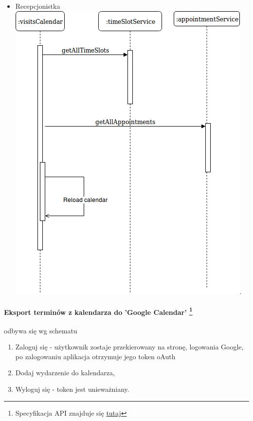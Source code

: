 \documentclass[polish,12pt]{aghthesis}
\begin{document}
\begin{itemize}
    \item Recepcjonistka \\
    \includegraphics[width=\textwidth]{cal-recep-init}.
\end{itemize}



\paragraph{Eksport terminów z kalendarza do 'Google Calendar' \footnote{Specyfikacja API znajduje się \href{https://www.googleapis.com/discovery/v1/apis/calendar/v3/rest}{tutaj}}} odbywa się wg schematu
\begin{enumerate}
    \item Zaloguj się - użytkownik zostaje przekierowany na stronę, logowania Google, po zalogowaniu aplikacja otrzymuje jego token oAuth
    \item Dodaj wydarzenie do kalendarza,
    \item Wyloguj się - token jest unieważniany.
\end{enumerate}
\end{document}
